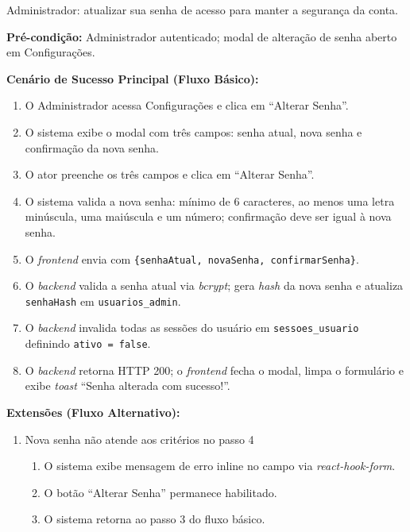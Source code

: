 Administrador: atualizar sua senha de acesso para manter a
segurança da conta.

\textbf{Pré-condição:} Administrador autenticado; modal de
alteração de senha aberto em Configurações.

\textbf{Cenário de Sucesso Principal (Fluxo Básico):}
\begin{enumerate}
  \item O Administrador acessa Configurações e clica em
        ``Alterar Senha''.
  \item O sistema exibe o modal com três campos: senha
        atual, nova senha e confirmação da nova senha.
  \item O ator preenche os três campos e clica em
        ``Alterar Senha''.
  \item O sistema valida a nova senha: mínimo de 6
        caracteres, ao menos uma letra minúscula, uma
        maiúscula e um número; confirmação deve ser igual
        à nova senha.
  \item O \textit{frontend} envia
         com
        \texttt{\{senhaAtual, novaSenha, confirmarSenha\}}.
  \item O \textit{backend} valida a senha atual via
        \textit{bcrypt}; gera \textit{hash} da nova senha
        e atualiza \texttt{senhaHash} em
        \texttt{usuarios\_admin}.
  \item O \textit{backend} invalida todas as sessões do
        usuário em \texttt{sessoes\_usuario} definindo
        \texttt{ativo = false}.
  \item O \textit{backend} retorna HTTP 200; o
        \textit{frontend} fecha o modal, limpa o formulário
        e exibe \textit{toast} ``Senha alterada com
        sucesso!''.
\end{enumerate}

\textbf{Extensões (Fluxo Alternativo):}

\begin{enumerate}
  \renewcommand{\theenumi}{4a}
  \renewcommand{\labelenumi}{\theenumi.}
  \item Nova senha não atende aos critérios no passo 4
  \begin{enumerate}
  \item O sistema exibe mensagem de erro inline no campo
        via \textit{react-hook-form}.
  \item O botão ``Alterar Senha'' permanece habilitado.
  \item O sistema retorna ao passo 3 do fluxo básico.
  \end{enumerate}
\end{enumerate}

